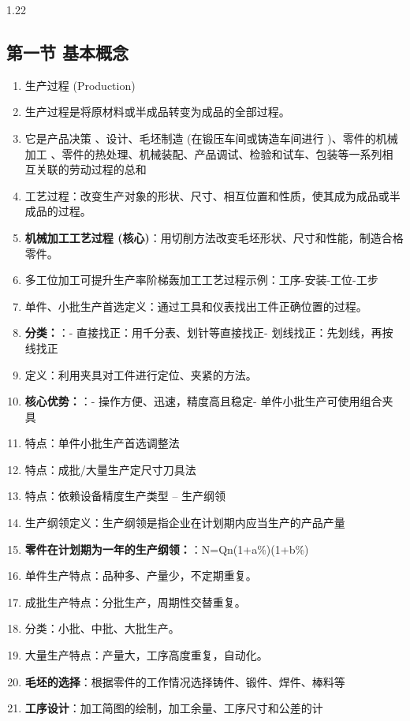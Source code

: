 \documentclass[12pt,a4paper]{article}
\begin{document}
\begin{spacing}{1.22}
\subsection{第一节 基本概念}
\begin{tcolorbox}[colback=yellow!6,colframe=red!55!black,title=重点,left=1mm,right=1mm]
\begin{enumerate}[leftmargin=2.2em,label=\arabic*.]
  \item 生产过程 (Production)
  \item 生产过程是将原材料或半成品转变为成品的全部过程。
  \item 它是产品决策 、设计、毛坯制造 (在锻压车间或铸造车间进行 )、零件的机械加工 、零件的热处理、机械装配、产品调试、检验和试车、包装等一系列相互关联的劳动过程的总和
  \item 工艺过程：改变生产对象的形状、尺寸、相互位置和性质，使其成为成品或半成品的过程。
  \item \textbf{机械加工工艺过程 (核心)}：用切削方法改变毛坯形状、尺寸和性能，制造合格零件。
  \item 多工位加工可提升生产率阶梯轰加工工艺过程示例：工序-安装-工位-工步
  \item 单件、小批生产首选定义：通过工具和仪表找出工件正确位置的过程。
  \item \textbf{分类：}：- 直接找正：用千分表、划针等直接找正- 划线找正：先划线，再按线找正
  \item 定义：利用夹具对工件进行定位、夹紧的方法。
  \item \textbf{核心优势：}：- 操作方便、迅速，精度高且稳定- 单件小批生产可使用组合夹具
  \item 特点：单件小批生产首选调整法
  \item 特点：成批/大量生产定尺寸刀具法
  \item 特点：依赖设备精度生产类型 – 生产纲领
  \item 生产纲领定义：生产纲领是指企业在计划期内应当生产的产品产量
  \item \textbf{零件在计划期为一年的生产纲领：}：N=Qn(1+a\%)(1+b\%)
  \item 单件生产特点：品种多、产量少，不定期重复。
  \item 成批生产特点：分批生产，周期性交替重复。
  \item 分类：小批、中批、大批生产。
  \item 大量生产特点：产量大，工序高度重复，自动化。
  \item \textbf{毛坯的选择}：根据零件的工作情况选择铸件、锻件、焊件、棒料等
  \item \textbf{工序设计}：加工简图的绘制，加工余量、工序尺寸和公差的计

\end{enumerate}
\end{tcolorbox}
\end{spacing}
\end{document}
